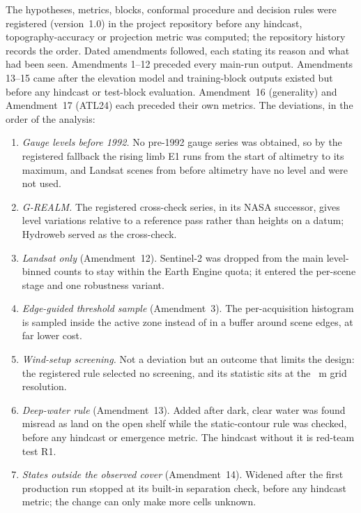 
The hypotheses, metrics, blocks, conformal procedure and decision rules were registered (version~1.0) in the project repository before any hindcast, topography-accuracy or projection metric was computed; the repository history records the order. Dated amendments followed, each stating its reason and what had been seen. Amendments 1--12 preceded every main-run output. Amendments 13--15 came after the elevation model and training-block outputs existed but before any hindcast or test-block evaluation. Amendment~16 (generality) and Amendment~17 (ATL24) each preceded their own metrics. The deviations, in the order of the analysis:

\begin{enumerate}
\item \emph{Gauge levels before 1992.} No pre-1992 gauge series was obtained, so by the registered fallback the rising limb E1 runs from the start of altimetry to its maximum, and  Landsat scenes from before altimetry have no level and were not used.
\item \emph{G-REALM.} The registered cross-check series, in its NASA successor, gives level variations relative to a reference pass rather than heights on a datum\citep{gwm_atbd2025}; Hydroweb served as the cross-check.
\item \emph{Landsat only} (Amendment~12). Sentinel-2 was dropped from the main level-binned counts to stay within the Earth Engine quota; it entered the per-scene stage and one robustness variant.
\item \emph{Edge-guided threshold sample} (Amendment~3). The per-acquisition histogram is sampled inside the active zone instead of in a buffer around scene edges, at far lower cost.
\item \emph{Wind-setup screening.} Not a deviation but an outcome that limits the design: the registered rule selected no screening, and its statistic sits at the ~m grid resolution.
\item \emph{Deep-water rule} (Amendment~13). Added after dark, clear water was found misread as land on the open shelf while the static-contour rule was checked, before any hindcast or emergence metric. The hindcast without it is red-team test R1.
\item \emph{States outside the observed cover} (Amendment~14). Widened after the first production run stopped at its built-in separation check, before any hindcast metric; the change can only make more cells unknown.

\end{enumerate}
